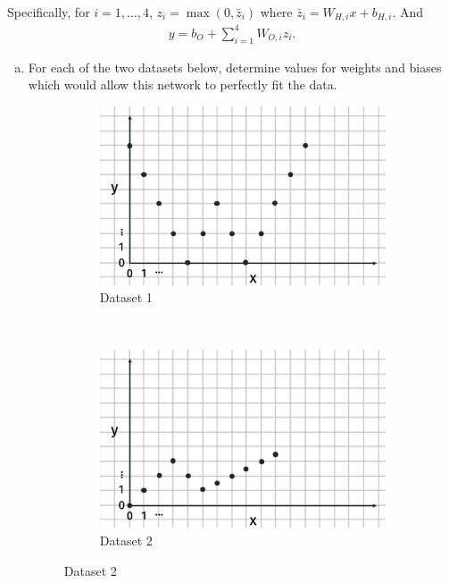 \documentclass[10pt]{article}
\begin{document}
Specifically, for $i = 1,\ldots, 4$, $z_i = \max(0,\bar{z}_i)$ where $\bar{z}_i = W_{H,i}x + b_{H,i}$. And
\begin{align*}
{y} = b_{O} + \sum_{i=1}^4 W_{O,i}z_i.
\end{align*}
\begin{enumerate}[(a)]
	\item For each of the two datasets below, determine values for weights and biases which would allow this network to perfectly fit the data.
	\captionsetup[subfigure]{labelformat=empty}
	\begin{figure}[h]
		\centering
		\begin{subfigure}{0.45\textwidth}
			\centering
			\includegraphics[width=\textwidth]{data_2.png}
			\caption{Dataset 1}
		\end{subfigure}
	~
		\begin{subfigure}{0.45\textwidth}
			\centering
			\includegraphics[width=\textwidth]{data_1.png}
						\caption{Dataset 2}
		\end{subfigure}
	\end{figure}


\end{enumerate}
\end{document}
